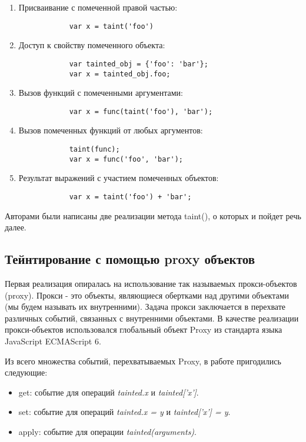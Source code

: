 \begin{enumerate}
	\item Присваивание с помеченной правой частью:
		\begin{lstlisting}
			var x = taint('foo')
		\end{lstlisting}
	\item Доступ к свойству помеченного объекта: 
		\begin{lstlisting}
			var tainted_obj = {'foo': 'bar'}; 
			var x = tainted_obj.foo; 
		\end{lstlisting}
	\item Вызов функций с помеченными аргументами:
		\begin{lstlisting}
			var x = func(taint('foo'), 'bar');
		\end{lstlisting}
	\item Вызов помеченных функций от любых аргументов:
		\begin{lstlisting}
			taint(func);
			var x = func('foo', 'bar');
		\end{lstlisting}
	\item Результат выражений с участием помеченных объектов:
		\begin{lstlisting}
			var x = taint('foo') + 'bar';
		\end{lstlisting}
\end{enumerate}


Авторами были написаны две реализации метода taint(), о которых и пойдет речь далее.

\subsection{Тейнтирование с помощью proxy объектов}
	Первая реализация опиралась на использование так называемых прокси-объектов (proxy). Прокси - это объекты, являющиеся обертками над другими объектами (мы будем называть их внутренними). Задача прокси заключается в перехвате различных событий, связанных с внутренними объектами. В качестве реализации прокси-объектов использовался глобальный объект Proxy \cite{proxy} из стандарта языка JavaScript ECMAScript 6.

	
	Из всего множества событий, перехватываемых Proxy, в работе пригодились следующие:
	

	\begin{itemize}
		\item get: событие для операций \textit{tainted.x} и \textit{tainted['x']}.
		\item set: событие для операций \textit{tainted.x = y} и \textit{tainted['x'] = y}.
		\item apply: событие для операции \textit{tainted(arguments)}.
	\end{itemize}


